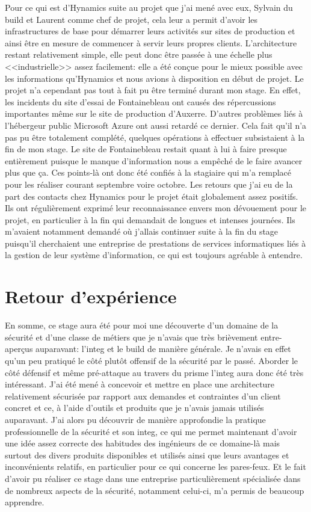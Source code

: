 \documentclass[12pt, oneside, a4paper, titlepage]{report}
\begin{document}
Pour ce qui est d'Hynamics suite au projet que j'ai mené avec eux, Sylvain du
\gls{build} et Laurent comme chef de projet, cela leur a permit d'avoir les
infrastructures de base pour démarrer leurs activités sur sites de production et
ainsi être en mesure de commencer à servir leurs propres clients. L'architecture
restant relativement simple, elle peut donc être passée à une échelle plus
<<industrielle>> assez facilement: elle a été conçue pour le mieux possible avec
les informations qu'Hynamics et nous avions à disposition en début de projet. Le
projet n'a cependant pas tout à fait pu être terminé durant mon stage. En effet,
les incidents du site d'essai de Fontainebleau ont causés des répercussions
importantes même sur le site de production d'Auxerre. D'autres problèmes liés à
l'hébergeur public Microsoft Azure ont aussi retardé ce dernier. Cela fait qu'il
n'a pas pu être totalement complété, quelques opérations à effectuer
subsistaient à la fin de mon stage. Le site de Fontainebleau restait quant à lui
à faire presque entièrement puisque le manque d'information nous a empêché de le
faire avancer plus que ça. Ces points-là ont donc été confiés à la stagiaire qui
m'a remplacé pour les réaliser courant septembre voire octobre. Les retours que
j'ai eu de la part des contacts chez Hynamics pour le projet était globalement
assez positifs. Ils ont régulièrement exprimé leur reconnaissance envers mon
dévouement pour le projet, en particulier à la fin qui demandait de longues et
intenses journées. Ils m'avaient notamment demandé où j'allais continuer suite à
la fin du stage puisqu'il cherchaient une entreprise de prestations de services
informatiques liés à la gestion de leur système d'information, ce qui est
toujours agréable à entendre.

\section{Retour d'expérience}%
\label{sec:bilan::ret-exp}

En somme, ce stage aura été pour moi une découverte d'un domaine de la sécurité
et d'une classe de métiers que je n'avais que très brièvement entre-aperçus
auparavant: l'\gls{integ} et le \gls{build} de manière générale. Je n'avais en
effet qu'un peu pratiqué le côté plutôt offensif de la sécurité par le passé.
Aborder le côté défensif et même pré-attaque au travers du prisme l'\gls{integ}
aura donc été très intéressant. J'ai été mené à concevoir et mettre en place une
architecture relativement sécurisée par rapport aux demandes et contraintes d'un
client concret et ce, à l'aide d'outils et produits que je n'avais jamais
utilisés auparavant. J'ai alors pu découvrir de manière approfondie la pratique
professionnelle de la sécurité et son \gls{integ}, ce qui me permet maintenant
d'avoir une idée assez correcte des habitudes des ingénieurs de ce domaine-là
mais surtout des divers produits disponibles et utilisés ainsi que leurs
avantages et inconvénients relatifs, en particulier pour ce qui concerne les
pares-feux. Et le fait d'avoir pu réaliser ce stage dans une entreprise
particulièrement spécialisée dans de nombreux aspects de la sécurité, notamment
celui-ci, m'a permis de beaucoup apprendre.
\end{document}
